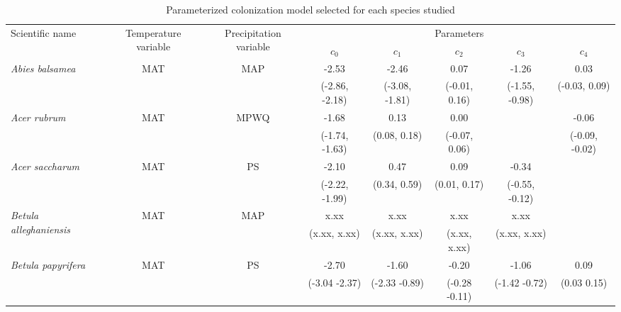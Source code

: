 \documentclass[11pt]{article}
\begin{document}

\newcommand{\ts}{\scriptsize}
\begin{table}[tb]
\small
\begin{threeparttable}
\label{tab:model_selection}
\caption{Parameterized colonization model selected for each species studied}
\begin{tabular}{lccccccc}
\toprule
\multirow{2}{*}{Scientific name} & \multirow{2}{2cm}{\centering Temperature variable\tnote{*}} & 
\multirow{2}{2cm}{\centering Precipitation variable\tnote{\textdagger}} & \multicolumn{5}{c}{Parameters\tnote{\textdaggerdbl}} \\
& & & $c_0$ & $c_1$ & $c_2$ & $c_3$ & $c_4$ \\ 
\midrule

\multirow{2}{*}{\it Abies balsamea} & \multirow{2}{*}{MAT} & \multirow{2}{*}{MAP} & -2.53\tnote{\textsection} & -2.46 & 0.07 & -1.26 & 0.03 \\
 &  &  & {\ts (-2.86, -2.18)} & {\ts (-3.08, -1.81)} & {\ts (-0.01, 0.16)} & {\ts (-1.55, -0.98)} & {\ts (-0.03, 0.09)} \\

\multirow{2}{*}{\it Acer rubrum} & \multirow{2}{*}{MAT} & \multirow{2}{*}{MPWQ} & -1.68 & 0.13 & 0.00 &  & -0.06 \\
 &  &  & {\ts (-1.74, -1.63)} & {\ts (0.08, 0.18)} & {\ts (-0.07, 0.06)} &  & {\ts (-0.09, -0.02)} \\

\multirow{2}{*}{\it Acer saccharum} & \multirow{2}{*}{MAT} & \multirow{2}{*}{PS} & -2.10 & 0.47 & 0.09 & -0.34 &  \\
 &  &  & {\ts (-2.22, -1.99)} & {\ts (0.34, 0.59)} & {\ts (0.01, 0.17)} & {\ts (-0.55, -0.12)} &  \\

\multirow{2}{*}{\it Betula alleghaniensis} & \multirow{2}{*}{MAT} & \multirow{2}{*}{MAP} & x.xx & x.xx & x.xx & x.xx & \\
 &  &  & {\ts (x.xx, x.xx)} & {\ts (x.xx, x.xx)} & {\ts (x.xx, x.xx)} & {\ts (x.xx, x.xx)} & \\

\multirow{2}{*}{\it Betula papyrifera} & \multirow{2}{*}{MAT} & \multirow{2}{*}{PS} & -2.70 & -1.60 & -0.20 & -1.06 & 0.09 \\
 &  &  & {\ts (-3.04 -2.37)} & {\ts (-2.33 -0.89)} & {\ts (-0.28 -0.11)} & {\ts (-1.42 -0.72)} & {\ts (0.03  0.15)} \\


\end{tabular}
\end{threeparttable}
\end{table}
\end{document}
